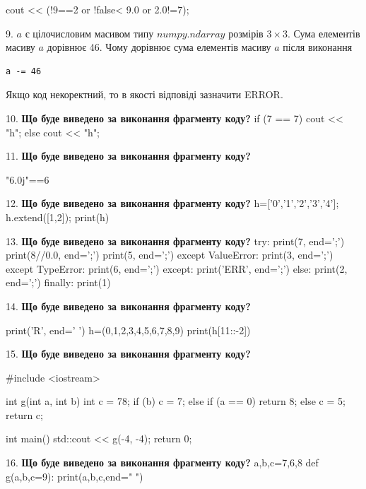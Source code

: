 \documentclass[11pt]{article}
\begin{document}
cout << (!9==2 or !false< 9.0 or 2.0!=7);
\par\vspace{5mm}
9. 
$a$ є цілочисловим масивом типу $numpy.ndarray$ розмірів $3{\times}3$. Сума елементів масиву $a$ дорівнює 46. Чому дорівнює сума елементів масиву $a$ після виконання 
\begin{verbatim}
a -= 46
\end{verbatim}


Якщо код некоректний, то в якості відповіді зазначити ERROR.


\par\vspace{5mm}
10. \textbf{Що буде виведено за виконання фрагменту коду?}
if (7 == 7)
    cout << "h";
else
    cout << "h";

\par\vspace{5mm}
11. \textbf{Що буде виведено за виконання фрагменту коду?}

"6.0j"==6
\par\vspace{5mm}
12. \textbf{Що буде виведено за виконання фрагменту коду?}
h=['0','1','2','3','4']; h.extend([1,2]); print(h)\par\vspace{5mm}
13. \textbf{Що буде виведено за виконання фрагменту коду?}
try:
    print(7, end=';')
    print(8//0.0, end=';')
    print(5, end=';')
except ValueError:
    print(3, end=';')
except TypeError:
    print(6, end=';')
except:
    print('ERR', end=';')
else:
    print(2, end=';')
finally:
    print(1)
\par\vspace{5mm}
14. \textbf{Що буде виведено за виконання фрагменту коду?}

print('R', end=' ')
h=(0,1,2,3,4,5,6,7,8,9)
print(h[11::-2])

\par\vspace{5mm}
15. \textbf{Що буде виведено за виконання фрагменту коду?}

#include <iostream>

int g(int a, int b){
    int c = 78;
    if (b)
        c = 7;
    else if (a == 0)
         return 8;
    else 
        c = 5;
    return c;
}

int main(){
    std::cout << g(-4, -4);
    return 0;
}
\par\vspace{5mm}
16. \textbf{Що буде виведено за виконання фрагменту коду?}
a,b,c=7,6,8
def g(a,b,c=9):
    print(a,b,c,end=" ")
\end{document}
